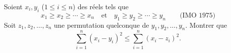 Soient $x_i, y_i$ ($1 \leq i \leq n$) des réels tels que
\[ x_1 \geq x_2 \geq \cdots \geq x_n \quad\text{et}\quad y_1 \geq y_2 \geq \cdots \geq y_n \qquad \text{(IMO 1975)} \]
Soit $z_1, z_2, \ldots, z_n$ une permutation quelconque de $y_1, y_2, \ldots, y_n$. Montrer que
\[ \sum_{i=1}^n (x_i - y_i)^2 \leq \sum_{i=1}^n (x_i - z_i)^2. \]
